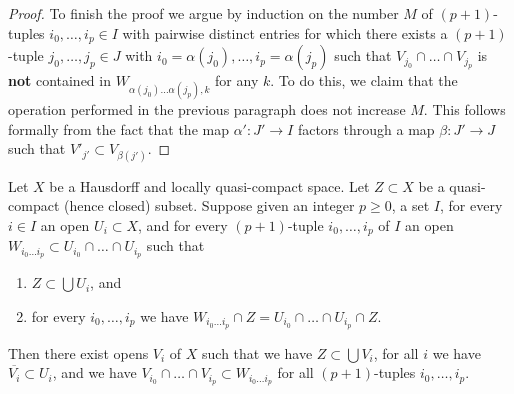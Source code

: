 \begin{proof}
\medskip\noindent
To finish the proof we argue by induction on the number $M$ of $(p + 1)$-tuples
$i_0, \ldots, i_p \in I$ with pairwise distinct entries for which there exists
a $(p + 1)$-tuple $j_0, \ldots, j_p \in J$ with
$i_0 = \alpha(j_0), \ldots, i_p = \alpha(j_p)$ such that
$V_{j_0} \cap \ldots \cap V_{j_p}$ is {\bf not} contained in
$W_{\alpha(j_0) \ldots \alpha(j_p), k}$ for any $k$. To do this, we
claim that the operation performed in the previous paragraph does not
increase $M$. This follows formally from the fact that the map
$\alpha' : J' \to I$ factors through a map $\beta : J' \to J$
such that $V'_{j'} \subset V_{\beta(j')}$.
\end{proof}

\begin{lemma}
\label{lemma-lift-covering-of-a-closed}
Let $X$ be a Hausdorff and locally quasi-compact space.
Let $Z \subset X$ be a quasi-compact (hence closed) subset.
Suppose given an integer $p \geq 0$, a set $I$, for every $i \in I$
an open $U_i \subset X$, and for every $(p + 1)$-tuple
$i_0, \ldots, i_p$ of $I$ an open
$W_{i_0 \ldots i_p} \subset U_{i_0} \cap \ldots \cap U_{i_p}$
such that
\begin{enumerate}
\item $Z \subset \bigcup U_i$, and
\item for every $i_0, \ldots, i_p$ we have
$W_{i_0 \ldots i_p} \cap Z = U_{i_0} \cap \ldots \cap U_{i_p} \cap Z$.
\end{enumerate}
Then there exist opens $V_i$ of $X$ such that
we have $Z \subset \bigcup V_i$,
for all $i$ we have $\overline{V_i} \subset U_i$, and
we have $V_{i_0} \cap \ldots \cap V_{i_p} \subset W_{i_0 \ldots i_p}$
for all $(p + 1)$-tuples $i_0, \ldots, i_p$.
\end{lemma}

